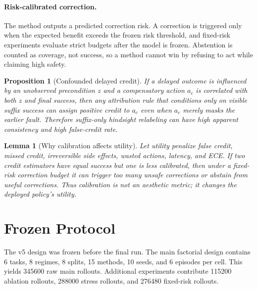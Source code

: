 \documentclass{article}
\newtheorem{proposition}{Proposition}
\newtheorem{lemma}{Lemma}
\begin{document}
\paragraph{Risk-calibrated correction.}
The method outputs a predicted correction risk. A correction is triggered only when the expected benefit exceeds the frozen risk threshold, and fixed-risk experiments evaluate strict budgets after the model is frozen. Abstention is counted as coverage, not success, so a method cannot win by refusing to act while claiming high safety.

\begin{proposition}[Confounded delayed credit]
If a delayed outcome is influenced by an unobserved precondition $z$ and a compensatory action $a_c$ is correlated with both $z$ and final success, then any attribution rule that conditions only on visible suffix success can assign positive credit to $a_c$ even when $a_c$ merely masks the earlier fault. Therefore suffix-only hindsight relabeling can have high apparent consistency and high false-credit rate.
\end{proposition}

\begin{lemma}[Why calibration affects utility]
Let utility penalize false credit, missed credit, irreversible side effects, wasted actions, latency, and ECE. If two credit estimators have equal success but one is less calibrated, then under a fixed-risk correction budget it can trigger too many unsafe corrections or abstain from useful corrections. Thus calibration is not an aesthetic metric; it changes the deployed policy's utility.
\end{lemma}

\section{Frozen Protocol}
The v5 design was frozen before the final run. The main factorial design contains 6 tasks, 8 regimes, 8 splits, 15 methods, 10 seeds, and 6 episodes per cell. This yields 345600 raw main rollouts. Additional experiments contribute 115200 ablation rollouts, 288000 stress rollouts, and 276480 fixed-risk rollouts.
\end{document}
